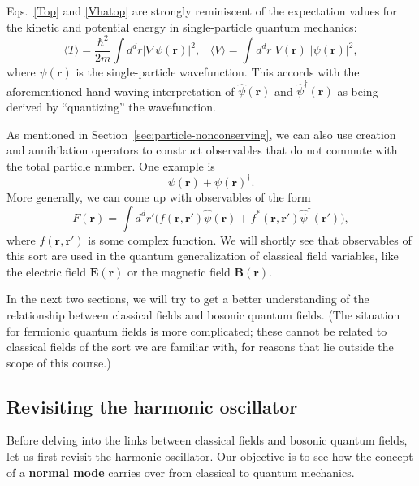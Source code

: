 \documentclass[prx,12pt]{revtex4-2}
\begin{document}
Eqs.~\eqref{Top} and \eqref{Vhatop} are strongly reminiscent of the
expectation values for the kinetic and potential energy in
single-particle quantum mechanics:
\begin{equation}
  \langle T\rangle = \frac{\hbar^2}{2m} \int d^d r \left|\nabla\psi(\mathbf{r})\right|^2, \;\;\; \langle V\rangle = \int d^dr \; V(\mathbf{r}) \; |\psi(\mathbf{r})|^2,
\end{equation}
where $\psi(\mathbf{r})$ is the single-particle wavefunction.  This
accords with the aforementioned hand-waving interpretation of
$\hat{\psi}(\mathbf{r})$ and $\hat{\psi}^\dagger(\mathbf{r})$ as being
derived by ``quantizing'' the wavefunction.

As mentioned in Section~\ref{sec:particle-nonconserving}, we can also
use creation and annihilation operators to construct observables that
do not commute with the total particle number.  One example is
\begin{equation*}
  \psi(\mathbf{r}) + \psi(\mathbf{r})^\dagger.
\end{equation*}
More generally, we can come up with observables of the form
\begin{equation}
  F(\mathbf{r}) = \int d^dr' \Big(f(\mathbf{r},\mathbf{r}') \hat{\psi}(\mathbf{r}) + f^*(\mathbf{r},\mathbf{r}') \hat{\psi}^\dagger(\mathbf{r}') \Big),
  \label{fieldop}
\end{equation}
where $f(\mathbf{r},\mathbf{r}')$ is some complex function.  We will
shortly see that observables of this sort are used in the quantum
generalization of classical field variables, like the electric field
$\mathbf{E}(\mathbf{r})$ or the magnetic field
$\mathbf{B}(\mathbf{r})$.

In the next two sections, we will try to get a better understanding of
the relationship between classical fields and bosonic quantum fields.
(The situation for fermionic quantum fields is more complicated; these
cannot be related to classical fields of the sort we are familiar
with, for reasons that lie outside the scope of this course.)

\subsection{Revisiting the harmonic oscillator}
\label{sec:ho}

Before delving into the links between classical fields and bosonic
quantum fields, let us first revisit the harmonic oscillator.  Our
objective is to see how the concept of a \textbf{normal mode} carries
over from classical to quantum mechanics.
\end{document}
